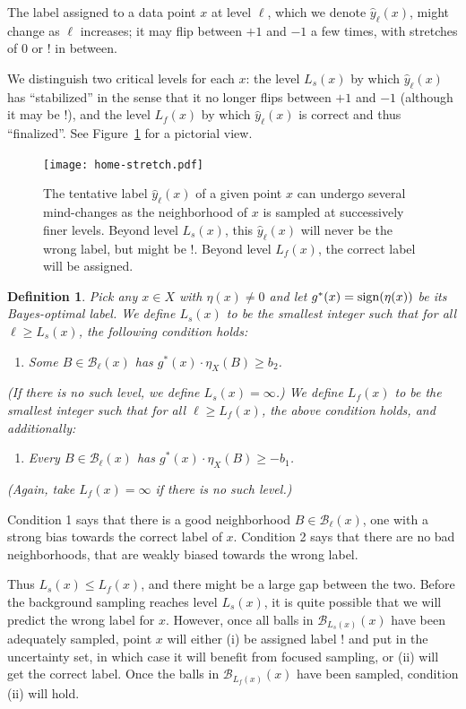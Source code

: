 \documentclass{article}
\def\B{{\mathcal B}}
\def\yh{{\widehat{y}}}
\def\sign{{\rm sign}}
\newtheorem{defn}[thm]{Definition}
\begin{document}
The label assigned to a data point $x$ at level $\ell$, which we denote $\yh_\ell(x)$, might change as $\ell$ increases; it may flip between $+1$ and $-1$ a few times, with stretches of $0$ or $!$ in between.

We distinguish two critical levels for each $x$: the level $L_s(x)$ by which $\yh_\ell(x)$ has ``stabilized'' in the sense that it no longer flips between $+1$ and $-1$ (although it may be $!$), and the level $L_f(x)$ by which $\yh_\ell(x)$ is correct and thus ``finalized''. See Figure~\ref{fig:two-levels} for a pictorial view.

\begin{figure}
\begin{center}
\texttt{[image: home-stretch.pdf]}
\end{center}
\caption{The tentative label $\yh_\ell(x)$ of a given point $x$ can undergo several mind-changes as the neighborhood of $x$ is sampled at successively finer levels. Beyond level $L_s(x)$, this $\yh_\ell(x)$ will never be the wrong label, but might be $!$. Beyond level $L_f(x)$, the correct label will be assigned.}
\label{fig:two-levels}
\end{figure}

\begin{defn}
Pick any $x \in X$ with $\eta(x) \neq 0$ and let $g^*(x) = \sign(\eta(x))$ be its Bayes-optimal label. We define $L_s(x)$ to be the smallest integer such that for all $\ell \geq L_s(x)$, the following condition holds:
\begin{enumerate}
\item[1.] Some $B \in \B_\ell(x)$ has $g^*(x) \cdot \eta_X(B) \geq b_2$.
\end{enumerate}
(If there is no such level, we define $L_s(x) = \infty$.) We define $L_f(x)$ to be the smallest integer such that for all $\ell \geq L_f(x)$, the above condition holds, and additionally:
\begin{enumerate}
\item[2.] Every $B \in \B_\ell(x)$ has $g^*(x) \cdot \eta_X(B) \geq -b_1$.
\end{enumerate} 
(Again, take $L_f(x) = \infty$ if there is no such level.) 
\label{defn:Lsf}
\end{defn}
Condition 1 says that there is a good neighborhood $B \in \B_\ell(x)$, one with a strong bias towards the correct label of $x$. Condition 2 says that there are no bad neighborhoods, that are weakly biased towards the wrong label.

Thus $L_s(x) \leq L_f(x)$, and there might be a large gap between the two. Before the background sampling reaches level $L_s(x)$, it is quite possible that we will predict the wrong label for $x$. However, once all balls in $\B_{L_s(x)}(x)$ have been adequately sampled, point $x$ will either (i) be assigned label $!$ and put in the uncertainty set, in which case it will benefit from focused sampling, or (ii) will get the correct label. Once the balls in $\B_{L_f(x)}(x)$ have been sampled, condition (ii) will hold.
\end{document}
